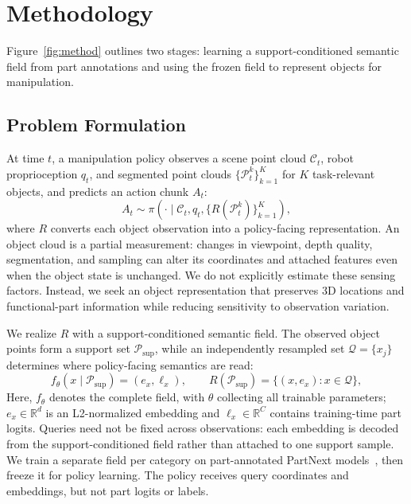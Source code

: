 \section{Methodology}
\label{sec:method}

Figure~\ref{fig:method} outlines two stages: learning a support-conditioned semantic field from part annotations and using the frozen field to represent objects for manipulation.

\subsection{Problem Formulation}

At time $t$, a manipulation policy observes a scene point cloud $\mathcal{C}_t$, robot proprioception $q_t$, and segmented point clouds $\{\mathcal{P}_t^k\}_{k=1}^{K}$ for $K$ task-relevant objects, and predicts an action chunk $A_t$:
\begin{equation}
    A_t\sim\pi\!\left(\cdot\mid\mathcal{C}_t,q_t,
    \{R(\mathcal{P}_t^k)\}_{k=1}^{K}\right),
    \label{eq:policy_problem}
\end{equation}
where $R$ converts each object observation into a policy-facing representation. An object cloud is a partial measurement: changes in viewpoint, depth quality, segmentation, and sampling can alter its coordinates and attached features even when the object state is unchanged. We do not explicitly estimate these sensing factors. Instead, we seek an object representation that preserves 3D locations and functional-part information while reducing sensitivity to observation variation.

We realize $R$ with a support-conditioned semantic field. The observed object points form a support set $\mathcal{P}_{\mathrm{sup}}$, while an independently resampled set $\mathcal{Q}=\{x_j\}$ determines where policy-facing semantics are read:
\begin{equation}
    f_{\theta}(x\mid\mathcal{P}_{\mathrm{sup}})=(e_x,\ell_x),
    \qquad
    R(\mathcal{P}_{\mathrm{sup}})=\{(x,e_x):x\in\mathcal{Q}\},
    \label{eq:field}
\end{equation}
Here, $f_{\theta}$ denotes the complete field, with $\theta$ collecting all trainable parameters; $e_x\in\mathbb{R}^{d}$ is an L2-normalized embedding and $\ell_x\in\mathbb{R}^{C}$ contains training-time part logits. Queries need not be fixed across observations: each embedding is decoded from the support-conditioned field rather than attached to one support sample. We train a separate field per category on part-annotated PartNext models~\cite{wang2026partnext}, then freeze it for policy learning. The policy receives query coordinates and embeddings, but not part logits or labels.



